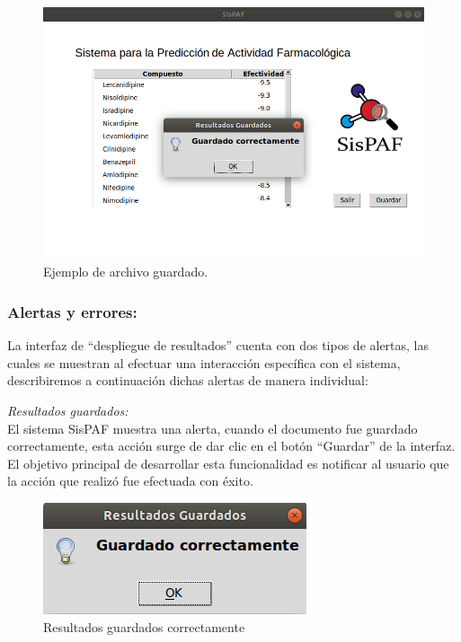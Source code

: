 \begin{figure}[H]
    \centering
    \includegraphics[scale=0.52]{Capitulo4/Documentos/imagenes_generacion/imagen-2-2-8-1.png}
    \caption{Ejemplo de archivo guardado.}
    \label{fig:my_label}
\end{figure}

\subsubsection{Alertas y errores:}
\noindent La interfaz de “despliegue de resultados” cuenta con dos tipos de alertas, las cuales se muestran al efectuar una interacción específica con el sistema, describiremos a continuación dichas alertas de manera individual:

\noindent\textit{Resultados guardados:}\\

\noindent El sistema SisPAF muestra una alerta, cuando el documento fue guardado correctamente, esta acción surge de dar clic en el botón “Guardar” de la interfaz. El objetivo principal de desarrollar esta funcionalidad es notificar al usuario que la acción que realizó fue efectuada con éxito.\\

\begin{figure}[H]
    \centering
    \includegraphics[scale=0.85]{Capitulo4/Documentos/imagenes_generacion/manual_3.png}
    \caption{Resultados guardados correctamente}
    \label{resultados_guard}
\end{figure}

